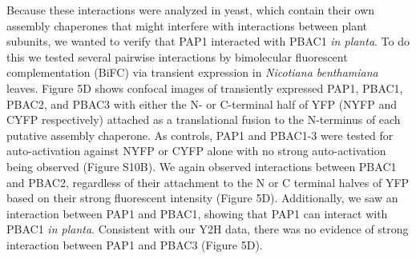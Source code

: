 Because these interactions were analyzed in yeast, which contain their own assembly chaperones that might interfere with interactions between plant subunits, we wanted to verify that PAP1 interacted with PBAC1 \textit{in planta}. To do this we tested several pairwise interactions by bimolecular fluorescent complementation (BiFC) via transient expression in \textit{Nicotiana benthamiana} leaves. Figure 5D shows confocal images of transiently expressed PAP1, PBAC1, PBAC2, and PBAC3 with either the N- or C-terminal half of YFP (NYFP and CYFP respectively) attached as a translational fusion to the N-terminus of each putative assembly chaperone. As controls, PAP1 and PBAC1-3 were tested for auto-activation against NYFP or CYFP alone with no strong auto-activation being observed (Figure S10B). We again observed interactions between PBAC1 and PBAC2, regardless of their attachment to the N or C terminal halves of YFP based on their strong fluorescent intensity (Figure 5D). Additionally, we saw an interaction between PAP1 and PBAC1, showing that PAP1 can interact with PBAC1 \textit{in planta}.  Consistent with our Y2H data, there was no evidence of strong interaction between PAP1 and PBAC3 (Figure 5D). 

